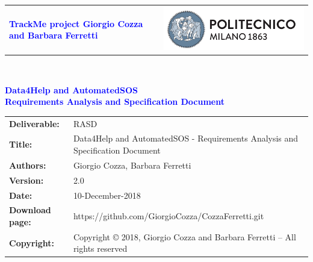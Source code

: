 
\usepackage{alloy-style}
\usepackage{inconsolata}
\usepackage{hyperref}

\hypersetup{%
	colorlinks = true,
	linkcolor  = black
}

\lstset{
	basicstyle=\ttfamily,
}




\begin{titlepage}



{\begin{table}[t!]
\centering
\begin{tabu} to \textwidth { X[1.3,r,p] X[1.7,l,p] }
\textcolor{Blue}
{\textbf{\small{TrackMe project Giorgio Cozza and Barbara Ferretti}}} & \includegraphics[scale=0.5]{Images/PolimiLogo}
\end{tabu}
\end{table}}~\\ [7cm]


\begin{center}

{\textcolor{Blue}{\textbf{\Huge{Data4Help and AutomatedSOS}}}} \\ [0,5cm]
{\textcolor{Blue}{\textbf{\LARGE{Requirements Analysis and Specification Document}}}} \\ [1cm]


\end{center}

\end{titlepage}

\begin{table}[h!]
\begin{tabu} to \textwidth { X[0.3,r,p] X[0.7,l,p] }
\hline 
\textbf{Deliverable:} & RASD\\
\textbf{Title:} & Data4Help and AutomatedSOS - Requirements Analysis and Specification Document \\
\textbf{Authors:} & Giorgio Cozza, Barbara Ferretti \\
\textbf{Version:} & 2.0 \\ 
\textbf{Date:} & 10-December-2018 \\
\textbf{Download page:} & https://github.com/GiorgioCozza/CozzaFerretti.git \\
\textbf{Copyright:} & Copyright © 2018, Giorgio Cozza and Barbara Ferretti – All rights reserved \\ 
\hline

\end{tabu}
\end{table}




